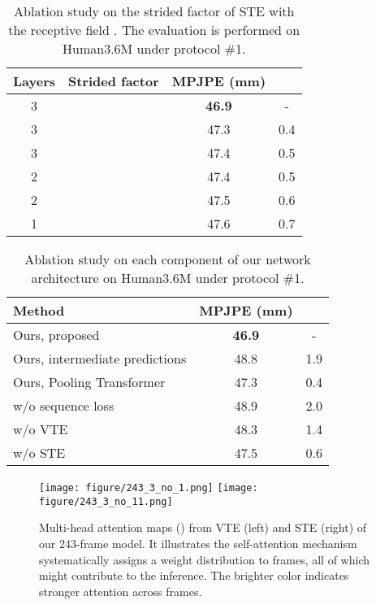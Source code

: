 \documentclass[10pt,twocolumn,letterpaper]{article}
\begin{document}
\begin{table}[t]
   \centering  
   \small
   \setlength{\tabcolsep}{4.36mm} 
   \begin{tabular}{cccc}
      \toprule  [1pt]
      Layers &Strided factor &MPJPE (mm) &\\
      \midrule  [0.5pt]  
      3 & &\textbf{46.9} &- \\
      3 & &47.3 &0.4 \\
      3 & &47.4 &0.5 \\
      2 & &47.4 &0.5 \\
      2 & &47.5 &0.6 \\
      1 & &47.6 &0.7 \\
      \toprule [1pt]
   \end{tabular}
   \caption
   {
    Ablation study on the strided factor of STE with the receptive field . 
    The evaluation is performed on Human3.6M under protocol \#1.
   }
 \label{table:Strided}
\end{table}

\begin{table}[t]
   \centering
   \small
   \setlength{\tabcolsep}{3.75mm} 
 
   \begin{tabular}{lcc}
     \toprule [1.0pt] 
       Method& MPJPE (mm) &  \\
       \midrule [0.5pt] 
       Ours, proposed &\textbf{46.9} &- \\
       Ours, intermediate predictions &48.8 &1.9 \\
       Ours, Pooling Transformer &47.3 &0.4 \\
      \midrule [0.5pt]

       w/o sequence loss &48.9 &2.0 \\
       w/o VTE &48.3 &1.4 \\
       w/o STE &47.5 &0.6 \\
       \toprule [1.0pt] 
   \end{tabular}
     \caption
     {
         Ablation study on each component of our network architecture on Human3.6M under protocol \#1. 
     }
   \label{table:ablation_method}
 \end{table}

 \begin{figure*} \centering
   { 
   \texttt{[image: figure/243\_3\_no\_1.png]}
   }
   {
   \texttt{[image: figure/243\_3\_no\_11.png]}
   }
   \caption{
      Multi-head attention maps () from VTE (left) and STE (right) of our 243-frame model. 
      It illustrates the self-attention mechanism systematically assigns a weight distribution to frames, all of which might contribute to the inference. 
      The brighter color indicates stronger attention across frames. 
   }
   \label{fig:attention}
\end{figure*}
\end{document}

